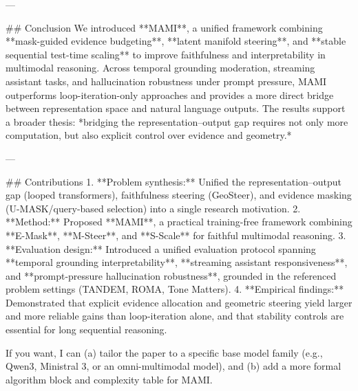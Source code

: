 ---

## Conclusion  
We introduced **MAMI**, a unified framework combining **mask-guided evidence budgeting**, **latent manifold steering**, and **stable sequential test-time scaling** to improve faithfulness and interpretability in multimodal reasoning. Across temporal grounding moderation, streaming assistant tasks, and hallucination robustness under prompt pressure, MAMI outperforms loop-iteration-only approaches and provides a more direct bridge between representation space and natural language outputs. The results support a broader thesis: *bridging the representation–output gap requires not only more computation, but also explicit control over evidence and geometry.*

---

## Contributions  
1. **Problem synthesis:** Unified the representation–output gap (looped transformers), faithfulness steering (GeoSteer), and evidence masking (U-MASK/query-based selection) into a single research motivation.  
2. **Method:** Proposed **MAMI**, a practical training-free framework combining **E-Mask**, **M-Steer**, and **S-Scale** for faithful multimodal reasoning.  
3. **Evaluation design:** Introduced a unified evaluation protocol spanning **temporal grounding interpretability**, **streaming assistant responsiveness**, and **prompt-pressure hallucination robustness**, grounded in the referenced problem settings (TANDEM, ROMA, Tone Matters).  
4. **Empirical findings:** Demonstrated that explicit evidence allocation and geometric steering yield larger and more reliable gains than loop-iteration alone, and that stability controls are essential for long sequential reasoning.

If you want, I can (a) tailor the paper to a specific base model family (e.g., Qwen3, Ministral 3, or an omni-multimodal model), and (b) add a more formal algorithm block and complexity table for MAMI.